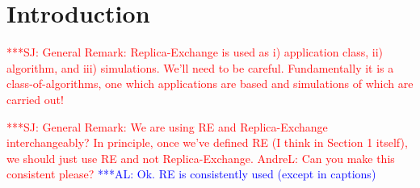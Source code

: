 \documentclass{rspublic}
\newcommand{\alnote}[1]{ {\textcolor{blue} { ***AL: #1 }}}
\newcommand{\jhanote}[1]{ {\textcolor{red} { ***SJ: #1 }}}
\newcommand{\alnote}[1]{}
\newcommand{\jhanote}[1]{}
\begin{document}
\begin{abstract}{Replica-Exchange, SAGA, Migol, Fault Tolerance}


  \jhanote{In this paper, we describe the design, development and
    deployment of a unique framework for constructing fault-tolerant
    distributed simulations.}

  \jhanote{Less emphasis on the SAGA/Migol framework: The framework
    consists of two primary components -- SAGA and Migol, is scalable,
    general purpose and extensible.}

  \jhanote{I think this can go: We provide details of a newly
    developed functionality in SAGA -- the Checkpoint and Recovery
    API. Migol is an adaptive Grid middleware, which addresses the
    fault tolerance of Grid applications and services by providing the
    capability to recover applications from checkpoint files
    transparently.  In addition to describing the integration of
    SAGA-CPR with the Migol infrastructure,} \alnote{I added a small
    note about Migol to the abstract (I tried to keep it short.)}

  \jhanote{We also outline our experiences with running a large scale,
    general-purpose, SAGA-CPR based RE application in a
    production distributed environment.}

\end{abstract}

\section{Introduction}

\jhanote{General Remark: Replica-Exchange is used as i) application
  class, ii) algorithm, and iii) simulations. We'll need to be
  careful. Fundamentally it is a class-of-algorithms, one which
  applications are based and simulations of which are carried out!}

\jhanote{General Remark: We are using RE and Replica-Exchange interchangeably?
  In principle, once we've defined RE (I think in Section 1 itself), we 
  should just use RE and not Replica-Exchange. AndreL: Can you make this
  consistent please?}
\alnote{Ok. RE is consistently used (except in captions)}
\end{document}
